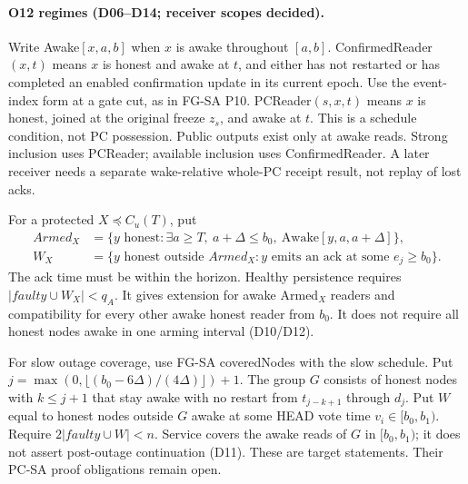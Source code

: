 \documentclass{article}
\begin{document}
\paragraph{O12 regimes (D06--D14; receiver scopes decided).}\mbox{}\par
Write Awake$[x,a,b]$ when $x$ is awake throughout $[a,b]$.
ConfirmedReader$(x,t)$ means $x$ is honest and awake at $t$, and either
has not restarted or has completed an enabled confirmation update in its
current epoch. Use the event-index form at a gate cut, as in FG-SA P10.
PCReader$(s,x,t)$ means $x$ is honest, joined at the original freeze
$z_s$, and awake at $t$. This is a schedule condition, not PC possession.
Public outputs exist only at awake reads. Strong inclusion uses PCReader;
available inclusion uses ConfirmedReader. A later receiver needs a
separate wake-relative whole-PC receipt result, not replay of lost acks.

For a protected $X\preceq C_u(T)$, put
\[
 \begin{aligned}
 \mathit{Armed}_X&=\{y\text{ honest}:\exists a\geq T,\ a+\Delta\leq b_0,
          \ \mathrm{Awake}[y,a,a+\Delta]\},\\
 W_X&=\{y\text{ honest outside }\mathit{Armed}_X:
          y\text{ emits an ack at some }e_j\geq b_0\}.
 \end{aligned}
\]
The ack time must be within the horizon. Healthy persistence requires
$|\mathit{faulty}\cup W_X|<q_A$. It gives extension for awake Armed$_X$
readers and compatibility for every other awake honest reader from $b_0$.
It does not require all honest nodes awake in one arming interval (D10/D12).

For slow outage coverage, use FG-SA coveredNodes with the slow schedule.
Put $j=\max(0,\lfloor(b_0-6\Delta)/(4\Delta)\rfloor)+1$.
The group $G$ consists of honest nodes with $k\leq j+1$ that stay awake
with no restart from $t_{j-k+1}$ through $d_j$. Put $W$ equal to honest
nodes outside $G$ awake at some HEAD vote time $v_i\in[b_0,b_1)$.
Require $2|\mathit{faulty}\cup W|<n$. Service covers the awake reads of
$G$ in $[b_0,b_1)$; it does not assert post-outage continuation (D11).
These are target statements. Their PC-SA proof obligations remain open.
\end{document}
